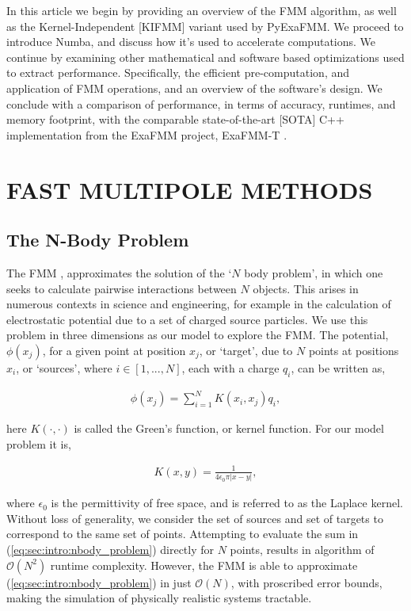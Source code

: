 \documentclass{IEEEcsmag}
\begin{document}
In this article we begin by providing an overview of the FMM algorithm, as well as the Kernel-Independent [KIFMM] variant
\cite{Ying2004} used by PyExaFMM. We proceed to introduce Numba, and discuss how it's used to accelerate computations. We continue by examining other mathematical and software based optimizations used to extract performance. Specifically, the efficient pre-computation, and application of FMM operations, and an overview of the software's design. We conclude with a comparison of performance, in terms of accuracy, runtimes, and memory footprint, with the comparable state-of-the-art [SOTA] C++ implementation from the ExaFMM project, ExaFMM-T \cite{Wang2021}.

\section{FAST MULTIPOLE METHODS}

\subsection{The N-Body Problem}

The FMM \cite{Greengard1987}, approximates the solution of the `$N$ body problem', in which one seeks to calculate pairwise interactions between $N$ objects. This arises in numerous contexts in science and engineering, for example in the calculation of electrostatic potential due to a set of charged source particles. We use this problem in three dimensions as our model to explore the FMM. The potential, $\phi(x_j)$, for a given point at position $x_j$, or `target', due to $N$ points at positions $x_i$, or `sources', where $i \in [1, ..., N]$, each with a charge $q_i$, can be written as,

\begin{eqnarray}
	\phi(x_j) = \sum_{i=1}^{N} K(x_i, x_j) q_i,
\label{eq:sec:intro:nbody_problem}
\end{eqnarray}

here $K(\cdot, \cdot)$ is called the Green's function, or kernel function. For our model problem it is,

\begin{eqnarray}
	K(x, y) = \frac{1}{4\epsilon_0\pi|x-y|},
\label{eq:sec:intro:laplace_kernel}
\end{eqnarray}

where $\epsilon_0$ is the permittivity of free space, and is referred to as the Laplace kernel. Without loss of generality, we consider the set of sources and set of targets to correspond to the same set of points. Attempting to evaluate the sum in (\ref{eq:sec:intro:nbody_problem}) directly for $N$ points, results in algorithm of $\mathcal{O}(N^2)$ runtime complexity. However, the FMM is able to approximate (\ref{eq:sec:intro:nbody_problem}) in just $\mathcal{O}(N)$, with proscribed error bounds, making the simulation of physically realistic systems tractable.
\end{document}
